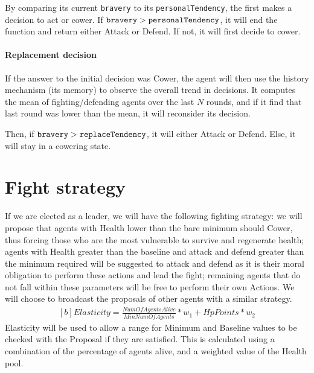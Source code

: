  By comparing its current \verb|bravery| to its \verb|personalTendency|, the first makes a decision to act or cower. If $\verb|bravery| > \verb|personalTendency|$, it will end the function and return either Attack or Defend. If not, it will first decide to cower.


 \paragraph{Replacement decision}

 If the answer to the initial decision was Cower, the agent will then use the history mechanism (its memory) to observe the overall trend in decisions. It computes the mean of fighting/defending agents over the last $N$ rounds, and if it find that last round was lower than the mean, it will reconsider its decision.

 Then, if  $\verb|bravery| > \verb|replaceTendency|$, it will either Attack or Defend. Else, it will stay in a cowering state.

\section{Fight strategy} If we are elected as a leader, we will have the following fighting strategy: we will propose that agents with Health lower than the bare minimum should Cower, thus forcing those who are the most vulnerable to survive and regenerate health; agents with Health greater than the baseline and attack and defend greater than the minimum required will be suggested to attack and defend as it is their moral obligation to perform these actions and lead the fight; remaining agents that do not fall within these parameters will be free to perform their own Actions. We will choose to broadcast the proposals of other agents with a similar strategy.
\begin{equation}
\begin{aligned}[b]
Elasticity = \frac{NumO\!f\!AgentsAlive}{MinNumO\!f\!Agents}*w_1 + HpPoints*w_2
\end{aligned}
\end{equation}
Elasticity will be used to allow a range for Minimum and Baseline values to be checked with the Proposal if they are satisfied. This is calculated using a combination of the percentage of agents alive, and a weighted value of the Health pool.

